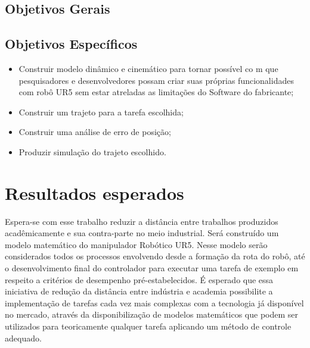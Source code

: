 \subsection{Objetivos Gerais}

\subsection{Objetivos Específicos}
 \begin{itemize}
   \item Construir modelo dinâmico e cinemático para tornar possível co m que pesquisadores e desenvolvedores possam criar suas próprias funcionalidades com robô UR5 sem estar atreladas as limitações do Software do fabricante; 
   \item Construir um trajeto para a tarefa escolhida;
   \item Construir uma análise de erro de posição;
    \item Produzir simulação do trajeto escolhido.   
    \linebreak[5]
 \end{itemize}
 
 
\section{Resultados esperados}  

Espera-se com esse trabalho reduzir a distância entre trabalhos produzidos acadêmicamente e sua contra-parte no meio industrial. Será construído um modelo matemático do manipulador Robótico UR5. Nesse modelo serão considerados todos os processos envolvendo desde a formação da rota do robô, até o desenvolvimento final do controlador para executar uma tarefa de exemplo em respeito a critérios de desempenho pré-estabelecidos. 
É esperado que essa iniciativa de redução da distância entre indústria e academia possibilite a implementação de tarefas cada vez mais complexas com a tecnologia já disponível no mercado, através da disponibilização de modelos matemáticos que podem ser utilizados para teoricamente qualquer tarefa aplicando um método de controle adequado. 

